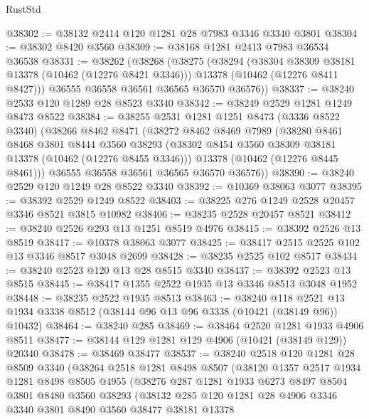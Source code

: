\begin{lexlean}{RustStd}
\begin{coremodule}
@38302 := @38132 @2414 @120 @1281 @28 @7983 @3346 @3340 @3801
@38304 := @38302 @8420 @3560
@38309 := @38168 @1281 @2413 @7983 @36534 @36538
@38331 := @38262
    (@38268
      (@38275
        (@38294
          (@38304 @38309 @38181 @13378 (@10462 (@12276 @8421 @3346)))
          @13378
          (@10462 (@12276 @8411 @8427)))
        @36555
        @36558
        @36561
        @36565
        @36570
        @36576))
@38337 := @38240 @2533 @120 @1289 @28 @8523 @3340
@38342 := @38249 @2529 @1281 @1249 @8473 @8522
@38384 := @38255
    @2531
    @1281
    @1251
    @8473
    (@3336 @8522 @3340)
    (@38266
      @8462
      @8471
      (@38272
        @8462
        @8469
        @7989
        (@38280
          @8461
          @8468
          @3801
          @8444
          @3560
          @38293
          (@38302 @8454 @3560 @38309 @38181 @13378 (@10462 (@12276 @8455 @3346)))
          @13378
          (@10462 (@12276 @8445 @8461)))
        @36555
        @36558
        @36561
        @36565
        @36570
        @36576))
@38390 := @38240 @2529 @120 @1249 @28 @8522 @3340
@38392 := @10369 @38063 @3077
@38395 := @38392 @2529 @1249 @8522
@38403 := @38225 @276 @1249 @2528 @20457 @3346 @8521 @3815 @10982
@38406 := @38235 @2528 @20457 @8521
@38412 := @38240 @2526 @293 @13 @1251 @8519 @4976
@38415 := @38392 @2526 @13 @8519
@38417 := @10378 @38063 @3077
@38425 := @38417 @2515 @2525 @102 @13 @3346 @8517 @3048 @2699
@38428 := @38235 @2525 @102 @8517
@38434 := @38240 @2523 @120 @13 @28 @8515 @3340
@38437 := @38392 @2523 @13 @8515
@38445 := @38417 @1355 @2522 @1935 @13 @3346 @8513 @3048 @1952
@38448 := @38235 @2522 @1935 @8513
@38463 := @38240
    @118
    @2521
    @13
    @1934
    @3338
    @8512
    (@38144 @96 @13 @96 @3338 (@10421 (@38149 @96)) @10432)
@38464 := @38240 @285
@38469 := @38464 @2520 @1281 @1933 @4906 @8511
@38477 := @38144 @129 @1281 @129 @4906 (@10421 (@38149 @129)) @20340
@38478 := @38469 @38477
@38537 := @38240
    @2518
    @120
    @1281
    @28
    @8509
    @3340
    (@38264
      @2518
      @1281
      @8498
      @8507
      (@38120
        @1357
        @2517
        @1934
        @1281
        @8498
        @8505
        @4955
        (@38276
          @287
          @1281
          @1933
          @6273
          @8497
          @8504
          @3801
          @8480
          @3560
          @38293
          (@38132
            @285
            @120
            @1281
            @28
            @4906
            @3346
            @3340
            @3801
            @8490
            @3560
            @38477
            @38181
            @13378

\end{coremodule}
\end{lexlean}
